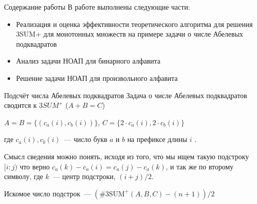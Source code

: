 \documentclass[hyperref=unicode,graphics=pdflatex,12pt]{beamer}
\begin{document}
\begin{frame}{Содержание работы}
\hspace{0.5cm}
В работе выполнены следующие части:
\begin{itemize}
\item<1-> Реализация и оценка эффективности теоретического алгоритма для решения 3SUM+
  для монотонных множеств на примере задачи о числе Абелевых подквадратов
\item<2-> Анализ задачи НОАП для бинарного алфавита
\item<3-> Решение задачи НОАП для произвольного алфавита
\end{itemize}
\end{frame}

\begin{frame}{Подсчёт числа Абелевых подквадратов}
Задача о числе Абелевых подквадратов сводится к $3SUM^+$ ($A + B = C$)
\vspace{0.5cm}

 $A = B = \{(c_a(i), c_b(i))\}$, $C = \{2 \cdot c_a(i), 2 \cdot c_b(i)\}$
\vspace{0.5cm}

где $c_a(i), c_b(i)$~--- число букв $a$ и $b$ на префиксе длины $i$
\vspace{0.5cm}.

Смысл сведения можно понять, исходя из того, что мы ищем такую подстроку $[i;j)$ что верно $c_a(k)-c_a(i)=c_a(j)-c_a(k)$, и так же по второму символу, где $k$~--- центр подстроки, $(i+j)/2$.

\vspace{0.5cm}

 Искомое число подстрок~--- $(\#3\text{SUM}^+(A, B, C) - (n + 1)) / 2$

\end{frame}
\end{document}

